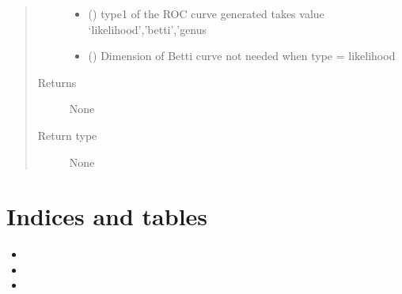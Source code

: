 \documentclass[letterpaper,10pt,english]{sphinxmanual}
\begin{document}
\begin{fulllineitems}
\begin{quote}
\begin{description}
\begin{itemize}
\item {} 
\sphinxAtStartPar
{} () \textendash{} type1 of the ROC curve generated takes value ‘likelihood’,’betti’,’genus

\item {} 
\sphinxAtStartPar
{} () \textendash{} Dimension of Betti curve not needed when type = likelihood

\end{itemize}

\item[{Returns}] \leavevmode
\sphinxAtStartPar
None

\item[{Return type}] \leavevmode
\sphinxAtStartPar
None

\end{description}\end{quote}

\end{fulllineitems}



\chapter{Indices and tables}
\label{\detokenize{index:indices-and-tables}}\begin{itemize}
\item {} 
\sphinxAtStartPar
{}

\item {} 
\sphinxAtStartPar
{}

\item {} 
\sphinxAtStartPar
{}

\end{itemize}


\renewcommand{\indexname}{Python Module Index}
\begin{sphinxtheindex}
\let\bigletter\sphinxstyleindexlettergroup
\bigletter{g}
\item\relax{}
\indexspace
\bigletter{r}
\item\relax{}
\indexspace
\bigletter{t}
\item\relax{}
\item\relax{}
\indexspace
\bigletter{u}
\item\relax{}
\end{sphinxtheindex}

\renewcommand{\indexname}{Index}
\printindex
\end{document}
